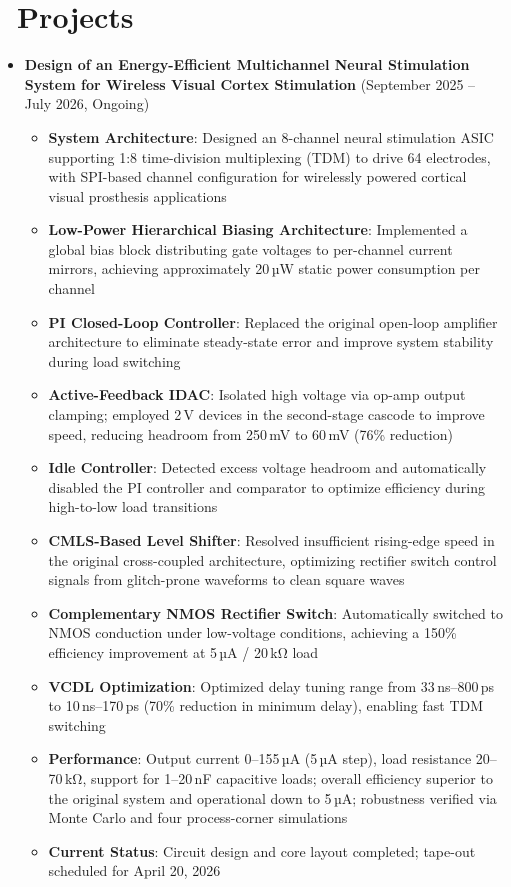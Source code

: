 \documentclass[11pt]{article}
\begin{document}
\section{\makebox[\widthof{\faGraduationCap}][c]{\color{CVBlue}\faUniversity}\ Projects}
\begin{itemize}
\item \textbf{Design of an Energy-Efficient Multichannel Neural Stimulation System for Wireless Visual Cortex Stimulation} (September 2025 -- July 2026, Ongoing)
    \begin{itemize}
    \item \textbf{System Architecture}: Designed an 8-channel neural stimulation ASIC supporting 1:8 time-division multiplexing (TDM) to drive 64 electrodes, with SPI-based channel configuration for wirelessly powered cortical visual prosthesis applications
    \item \textbf{Low-Power Hierarchical Biasing Architecture}: Implemented a global bias block distributing gate voltages to per-channel current mirrors, achieving approximately 20\,µW static power consumption per channel
    \item \textbf{PI Closed-Loop Controller}: Replaced the original open-loop amplifier architecture to eliminate steady-state error and improve system stability during load switching
    \item \textbf{Active-Feedback IDAC}: Isolated high voltage via op-amp output clamping; employed 2\,V devices in the second-stage cascode to improve speed, reducing headroom from 250\,mV to 60\,mV (76\% reduction)
    \item \textbf{Idle Controller}: Detected excess voltage headroom and automatically disabled the PI controller and comparator to optimize efficiency during high-to-low load transitions
    \item \textbf{CMLS-Based Level Shifter}: Resolved insufficient rising-edge speed in the original cross-coupled architecture, optimizing rectifier switch control signals from glitch-prone waveforms to clean square waves
    \item \textbf{Complementary NMOS Rectifier Switch}: Automatically switched to NMOS conduction under low-voltage conditions, achieving a 150\% efficiency improvement at 5\,µA / 20\,kΩ load
    \item \textbf{VCDL Optimization}: Optimized delay tuning range from 33\,ns--800\,ps to 10\,ns--170\,ps (70\% reduction in minimum delay), enabling fast TDM switching
    \item \textbf{Performance}: Output current 0--155\,µA (5\,µA step), load resistance 20--70\,kΩ, support for 1--20\,nF capacitive loads; overall efficiency superior to the original system and operational down to 5\,µA; robustness verified via Monte Carlo and four process-corner simulations
    \item \textbf{Current Status}: Circuit design and core layout completed; tape-out scheduled for April 20, 2026
    \end{itemize}


\end{itemize}
\end{document}
